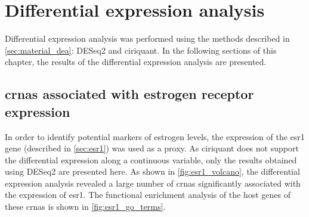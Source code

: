 \section{Differential expression analysis}
Differential expression analysis was performed using the methods described in
\cref{sec:material_dea}: DESeq2 and \gls{ciriquant}.
In the following sections of this chapter, the results of the differential
expression analysis are presented.

\subsection{\Glspl{crna} associated with estrogen receptor expression}

In order to identify potential markers of estrogen levels, the expression of
the \gls{esr1} gene (described in \cref{sec:esr1}) was used as a proxy.
As \gls{ciriquant} does not support the differential expression along a
continuous variable, only the results obtained using DESeq2 are presented here.
As shown in \cref{fig:esr1_volcano}, the differential expression analysis
revealed a large number of \glspl{crna} significantly associated with the
expression of \gls{esr1}.
The functional enrichment analysis of the host genes of these \glspl{crna} is
shown in \cref{fig:esr1_go_terms}.

